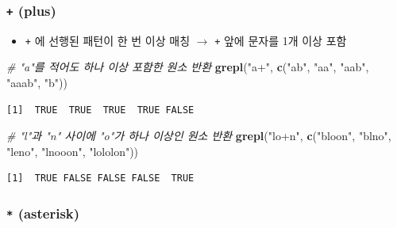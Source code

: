 \documentclass[
  11pt,
]{krantz}
\newenvironment{Shaded}{\begin{snugshade}}{\end{snugshade}}
\newcommand{\CommentTok}[1]{\textcolor[rgb]{0.37,0.37,0.37}{\textit{#1}}}
\newcommand{\KeywordTok}[1]{\textcolor[rgb]{0.27,0.27,0.27}{\textbf{#1}}}
\newcommand{\NormalTok}[1]{#1}
\newcommand{\StringTok}[1]{\textcolor[rgb]{0.5,0.5,0.5}{#1}}
\providecommand{\tightlist}{%
  \setlength{\itemsep}{0pt}\setlength{\parskip}{0pt}}
\begin{document}
\normalsize

\hypertarget{plus}{%
\subsubsection*{\texorpdfstring{\textbf{\texttt{+} (plus)}}{+ (plus)}}\label{plus}}


\begin{itemize}
\tightlist
\item
  \texttt{+} 에 선행된 패턴이 한 번 이상 매칭 \(\rightarrow\) \texttt{+} 앞에 문자를 1개 이상 포함
\end{itemize}

\footnotesize

\begin{Shaded}
\begin{Highlighting}[]
\CommentTok{# "a"를 적어도 하나 이상 포함한 원소 반환}
\KeywordTok{grepl}\NormalTok{(}\StringTok{"a+"}\NormalTok{, }\KeywordTok{c}\NormalTok{(}\StringTok{"ab"}\NormalTok{, }\StringTok{"aa"}\NormalTok{, }\StringTok{"aab"}\NormalTok{, }\StringTok{"aaab"}\NormalTok{, }\StringTok{"b"}\NormalTok{))}
\end{Highlighting}
\end{Shaded}

\begin{verbatim}
[1]  TRUE  TRUE  TRUE  TRUE FALSE
\end{verbatim}

\begin{Shaded}
\begin{Highlighting}[]
\CommentTok{# "l"과 "n" 사이에 "o"가 하나 이상인 원소 반환}
\KeywordTok{grepl}\NormalTok{(}\StringTok{"lo+n"}\NormalTok{, }\KeywordTok{c}\NormalTok{(}\StringTok{"bloon"}\NormalTok{, }\StringTok{"blno"}\NormalTok{, }\StringTok{"leno"}\NormalTok{, }\StringTok{"lnooon"}\NormalTok{, }\StringTok{"lololon"}\NormalTok{))}
\end{Highlighting}
\end{Shaded}

\begin{verbatim}
[1]  TRUE FALSE FALSE FALSE  TRUE
\end{verbatim}

\normalsize

\hypertarget{asterisk}{%
\subsubsection*{\texorpdfstring{\textbf{\texttt{*} (asterisk)}}{* (asterisk)}}\label{asterisk}}
\end{document}

